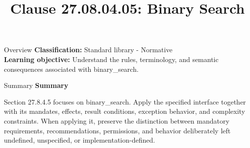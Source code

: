 \documentclass[10pt,letterpaper]{article}
\title{Clause 27.08.04.05: Binary Search}
\author{}
\date{}
\begin{document}
\maketitle
\begin{CornellOverviewBox}{Overview}
\textbf{Classification:} Standard library - Normative\\[2pt]
\textbf{Learning objective:} Understand the rules, terminology, and semantic consequences associated with binary\_search.
\end{CornellOverviewBox}\begin{CornellSummaryBox}{Summary}
{\sffamily\bfseries\color{Accent} Summary}\par\vspace{3pt}Section 27.8.4.5 focuses on binary\_search. Apply the specified interface together with its mandates, effects, result conditions, exception behavior, and complexity constraints. When applying it, preserve the distinction between mandatory requirements, recommendations, permissions, and behavior deliberately left undefined, unspecified, or implementation-defined.
\end{CornellSummaryBox}
\end{document}
